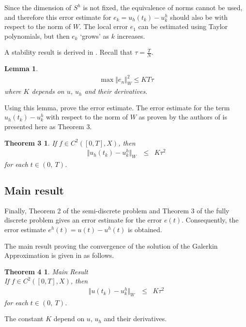 \documentclass[../../main.tex]{subfiles}
\begin{document}
Since the dimension of $S^h$ is not fixed, the equivalence of norms
cannot be used, and therefore this error estimate for $e_k = u_h(t_k) - u^h_k$
should also be with respect to the norm of $W$. The local error $e_1$ can be estimated using Taylor polynomials, but then $e_k$ `grows' as $k$ increases.

A stability result is derived in \cite{BV13}. Recall that $\displaystyle \tau = \frac{T}{N}$.

\newtheorem*{DC_Lem3}{Lemma}
\begin{DC_Lem3}
	\begin{eqnarray*}
		\max\Vert e_{n}\Vert_{W}^{2}\leq KT\tau
	\end{eqnarray*}
	where $K$ depends on $u$, $u_h$ and their derivatives.
\end{DC_Lem3}


Using this lemma, \cite{BV13} prove the error estimate. The error estimate for the term $u_h(t_k) - u^h_k$ with respect to the norm of $W$ as proven by the authors of \cite{BV13} is presented here as Theorem 3.

\newtheorem*{DC_Thm5_1}{Theorem 3}
\begin{DC_Thm5_1}
	If $f\in C^{2}([0,T],X)$, then
	\begin{eqnarray*}
		\Vert u_h(t_{k})-u_{k}^{h}\Vert_{W}\ & \leq & K\tau^2
	\end{eqnarray*}
	for each $t\in(0,\ T)$.
\end{DC_Thm5_1}

\subsection{Main result}
Finally, Theorem 2 of the semi-discrete problem and Theorem 3 of the fully
discrete problem gives an error estimate for the error $e(t)$. Consequently,
the error estimate $e^h(t) = u(t) - u^h(t)$ is obtained.

The main result proving the convergence of the solution of the Galerkin
Approximation is given in \cite{BV13} as follows.
\newtheorem*{DC_Thm5}{Theorem 4}
\begin{DC_Thm5}
	{Main Result}\\
	If $f\in C^{2}([0,T],X)$, then
	\begin{eqnarray*}
		\Vert u(t_{k})-u_{k}^{h}\Vert_{W}\ & \leq & K\tau^2
	\end{eqnarray*}
	for each $t\in(0,\ T)$.
\end{DC_Thm5}

The constant $K$ depend on $u$, $u_h$ and their derivatives.
\end{document}
